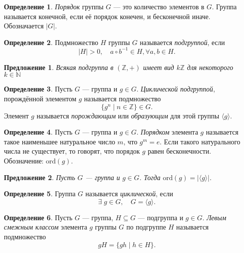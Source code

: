 \documentclass[a4paper]{article}
\theoremstyle{plain}
\newtheorem{proposal}{Предложение}
\theoremstyle{definition}
\newtheorem{definition}{Определение}
\numberwithin{definition}{section}
\numberwithin{proposal}{section}
\begin{document}
\begin{definition}
\emph{Порядок} группы \(G\) --- это количество элементов в \(G\). Группа называется конечной, если её порядок конечен, и бесконечной иначе. Обозначается \(|G|\).
\end{definition}

\begin{definition}
Подмножество \(H\) группы \(G\) называется \emph{подгруппой}, если
\begin{equation*}
 	|H| > 0, \quad a \circ b^{-1} \in H, \forall a,b \in H.
\end{equation*}
\end{definition}

\begin{proposal}
Всякая подгруппа в \((\mathbb{Z}, +)\) имеет вид \(k\mathbb{Z}\) для некоторого \(k \in \mathbb{N}\)
\end{proposal}

\begin{definition}
Пусть \(G\) --- группа и \(g \in G\). \emph{Циклической подгруппой}, порождённой элементом \(g\) называется подмножество
\begin{equation*}
	\{g^n \;|\; n \in \mathbb{Z}\} \in G.
\end{equation*}
Элемент \(g\) называется \emph{порождающим} или \emph{образующим} для этой группы \(\langle g \rangle\).
\end{definition}

\begin{definition}
Пусть \(G\) --- группа и \(g \in G\). \emph{Порядком} элемента \(g\) называется такое наименьшее натуральное число \(m\), что \(g^m = e\). Если такого натурального числа не существует, то говорят, что порядок \(g\) равен бесконечности. Обозначение: \(\mathrm{ord}(g)\).
\end{definition}

\begin{proposal}
Пусть \(G\) --- группа и \(g \in G\). Тогда \(\mathrm{ord}(g) = |\langle g \rangle|\).
\end{proposal}

\begin{definition}
Группа \(G\) называется \emph{циклической}, если 
\begin{equation*}
	\exists \; g \in G, \quad G = \langle g \rangle.
\end{equation*}
\end{definition}

\begin{definition}
Пусть \(G\) --- группа, \(H \subseteq G\) --- подгруппа и \(g \in G\). \emph{Левым смежным классом} элемента \(g\) группы \(G\) по подгруппе \(H\) называется подмножество
\begin{equation*}
	gH = \{gh \;|\; h \in H\}.
\end{equation*}
\end{definition}
\end{document}
